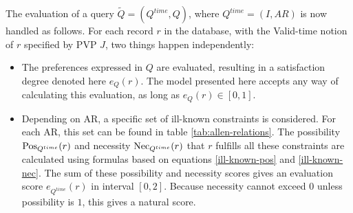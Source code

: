 The evaluation of a query $\tilde{Q} = \left( Q^{time}, Q \right)$, where $Q^{time} = \left( I, AR \right)$ is now handled as follows. For each record $r$ in the database, with the Valid-time notion of $r$ specified by PVP $J$, two things happen independently:



\begin{itemize}
\item
The preferences expressed in $Q$ are evaluated, resulting in a satisfaction degree denoted here $e_{Q}(r)$. The model presented here accepts any way of calculating this evaluation, as long as $e_{Q}(r) \in \left[0,1\right]$. 
\item
Depending on AR, a specific set of ill-known constraints is considered. For each AR, this set can be found in table \ref{tab:allen-relations}. The possibility $\operatorname{Pos}_{Q^{time}}(r)$ and necessity $\operatorname{Nec}_{Q^{time}}(r)$ that $r$ fulfills all these constraints are calculated using formulas based on equations \ref{ill-known-pos} and \ref{ill-known-nec}. The sum of these possibility and necessity scores gives an evaluation score $e_{Q^{time}}(r)$ in interval $\left[0,2\right]$. Because necessity cannot exceed $0$ unless possibility is $1$, this gives a natural score.
\end{itemize}


